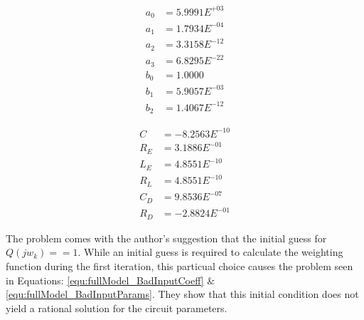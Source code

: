 \begin{multicols}{2}
    \begin{equation}
        \label{equ:fullModel_BadOutputCoeff}
        \begin{split}
             a_0 &= 5.9991E^{+03} \\
             a_1 &= 1.7934E^{-04} \\
             a_2 &= 3.3158E^{-12} \\
             a_3 &= 6.8295E^{-22} \\
             b_0 &= 1.0000        \\
             b_1 &= 5.9057E^{-03} \\
             b_2 &= 1.4067E^{-12}
        \end{split}
    \end{equation}

    \begin{equation}
        \label{equ:fullModel_BadOutputParams}
        \begin{split}
            C &= -8.2563E^{-10} \\
            R_E &=  3.1886E^{-01} \\
            L_E &=  4.8551E^{-10} \\
            R_L &=  4.8551E^{-10} \\
            C_D &=  9.8536E^{-07} \\
            R_D &= -2.8824E^{-01}
        \end{split}
    \end{equation}
\end{multicols}

The problem comes with the author's \cite{levy_iter} suggestion that the initial guess for $Q(jw_k) == 1$. While an initial guess is required to calculate the weighting function during the first iteration, this particual choice causes the problem seen in Equations: \eqref{equ:fullModel_BadInputCoeff} \& \eqref{equ:fullModel_BadInputParams}. They show that this initial condition does not yield a rational solution for the circuit parameters.


